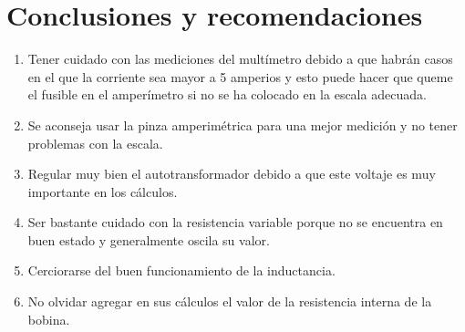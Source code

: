 \documentclass[a4paper,12pt]{report}
\begin{document}
\chapter{Conclusiones y recomendaciones}
\begin{enumerate}
\item Tener cuidado con las mediciones del multímetro debido a que habrán casos en el que la corriente sea mayor a 5 amperios y esto puede hacer que queme el fusible en el amperímetro si no se ha colocado en la escala adecuada.
\item Se aconseja usar la pinza amperimétrica para una mejor medición y no tener problemas con la escala.
\item Regular muy bien el autotransformador debido a que este voltaje es muy importante en los cálculos.
\item Ser bastante cuidado con la resistencia variable porque no se encuentra en buen estado y generalmente oscila su valor.
\item Cerciorarse del buen funcionamiento de la inductancia.
\item No olvidar agregar en sus cálculos el valor de la resistencia interna de la bobina.
\end{enumerate}
\end{document}
